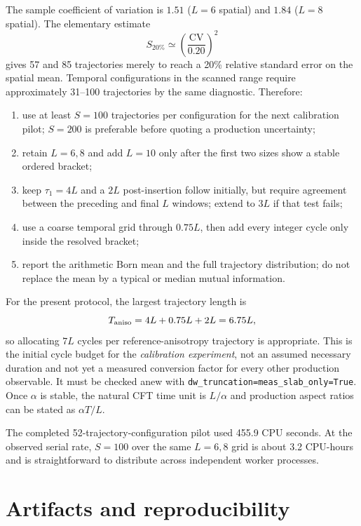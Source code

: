 \documentclass[10pt]{article}
\begin{document}
The sample coefficient of variation is $1.51$ ($L=6$ spatial) and $1.84$
($L=8$ spatial).  The elementary estimate
\begin{equation}
S_{20\%}\simeq\left(\frac{\mathrm{CV}}{0.20}\right)^2
\end{equation}
gives 57 and 85 trajectories merely to reach a 20\% relative standard error on
the spatial mean.  Temporal configurations in the scanned range require
approximately 31--100 trajectories by the same diagnostic.  Therefore:
\begin{enumerate}
\item use at least $S=100$ trajectories per configuration for the next
      calibration pilot; $S=200$ is preferable before quoting a production
      uncertainty;
\item retain $L=6,8$ and add $L=10$ only after the first two sizes show a stable
      ordered bracket;
\item keep $\tau_1=4L$ and a $2L$ post-insertion follow initially, but require
      agreement between the preceding and final $L$ windows; extend to $3L$ if
      that test fails;
\item use a coarse temporal grid through $0.75L$, then add every integer cycle
      only inside the resolved bracket;
\item report the arithmetic Born mean and the full trajectory distribution;
      do not replace the mean by a typical or median mutual information.
\end{enumerate}

For the present protocol, the largest trajectory length is
\begin{equation}
T_{\rm aniso}=4L+0.75L+2L=6.75L,
\end{equation}
so allocating $7L$ cycles per reference-anisotropy trajectory is appropriate.
This is the initial cycle budget for the \emph{calibration experiment}, not an
assumed necessary duration and not yet a measured conversion factor for every
other production observable.  It must be checked anew with
\texttt{dw\_truncation=meas\_slab\_only=True}.  Once
$\alpha$ is stable, the natural CFT time unit is $L/\alpha$ and production
aspect ratios can be stated as $\alpha T/L$.

The completed 52-trajectory-configuration pilot used 455.9 CPU seconds.  At the
observed serial rate, $S=100$ over the same $L=6,8$ grid is about 3.2 CPU-hours
and is straightforward to distribute across independent worker processes.

\section{Artifacts and reproducibility}
\end{document}
